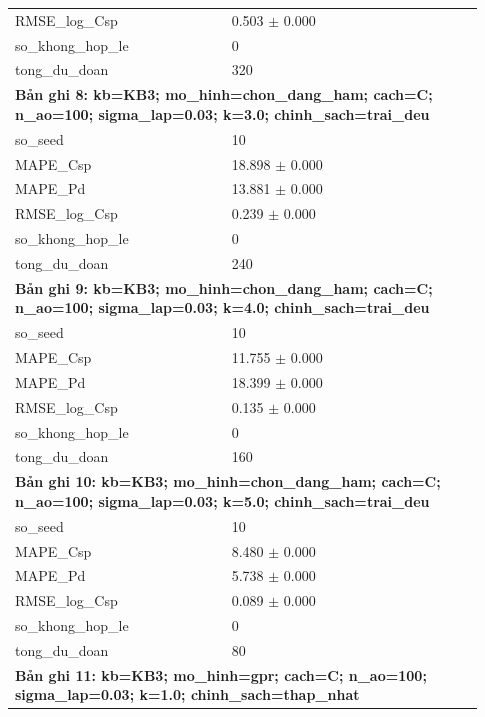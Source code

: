 \begin{longtable}{p{0.43\linewidth}p{0.50\linewidth}}
RMSE\_\allowbreak log\_\allowbreak Csp & 0.503 $\pm$ 0.000 \\
so\_\allowbreak khong\_\allowbreak hop\_\allowbreak le & 0 \\
tong\_\allowbreak du\_\allowbreak doan & 320 \\
\midrule
\multicolumn{2}{p{0.95\linewidth}}{\textbf{Bản ghi 8: kb=KB3; mo\_hinh=chon\_dang\_ham; cach=C; n\_ao=100; sigma\_lap=0.03; k=3.0; chinh\_sach=trai\_deu}} \\
so\_\allowbreak seed & 10 \\
MAPE\_\allowbreak Csp & 18.898 $\pm$ 0.000 \\
MAPE\_\allowbreak Pd & 13.881 $\pm$ 0.000 \\
RMSE\_\allowbreak log\_\allowbreak Csp & 0.239 $\pm$ 0.000 \\
so\_\allowbreak khong\_\allowbreak hop\_\allowbreak le & 0 \\
tong\_\allowbreak du\_\allowbreak doan & 240 \\
\midrule
\multicolumn{2}{p{0.95\linewidth}}{\textbf{Bản ghi 9: kb=KB3; mo\_hinh=chon\_dang\_ham; cach=C; n\_ao=100; sigma\_lap=0.03; k=4.0; chinh\_sach=trai\_deu}} \\
so\_\allowbreak seed & 10 \\
MAPE\_\allowbreak Csp & 11.755 $\pm$ 0.000 \\
MAPE\_\allowbreak Pd & 18.399 $\pm$ 0.000 \\
RMSE\_\allowbreak log\_\allowbreak Csp & 0.135 $\pm$ 0.000 \\
so\_\allowbreak khong\_\allowbreak hop\_\allowbreak le & 0 \\
tong\_\allowbreak du\_\allowbreak doan & 160 \\
\midrule
\multicolumn{2}{p{0.95\linewidth}}{\textbf{Bản ghi 10: kb=KB3; mo\_hinh=chon\_dang\_ham; cach=C; n\_ao=100; sigma\_lap=0.03; k=5.0; chinh\_sach=trai\_deu}} \\
so\_\allowbreak seed & 10 \\
MAPE\_\allowbreak Csp & 8.480 $\pm$ 0.000 \\
MAPE\_\allowbreak Pd & 5.738 $\pm$ 0.000 \\
RMSE\_\allowbreak log\_\allowbreak Csp & 0.089 $\pm$ 0.000 \\
so\_\allowbreak khong\_\allowbreak hop\_\allowbreak le & 0 \\
tong\_\allowbreak du\_\allowbreak doan & 80 \\
\midrule
\multicolumn{2}{p{0.95\linewidth}}{\textbf{Bản ghi 11: kb=KB3; mo\_hinh=gpr; cach=C; n\_ao=100; sigma\_lap=0.03; k=1.0; chinh\_sach=thap\_nhat}} \\

\end{longtable}

